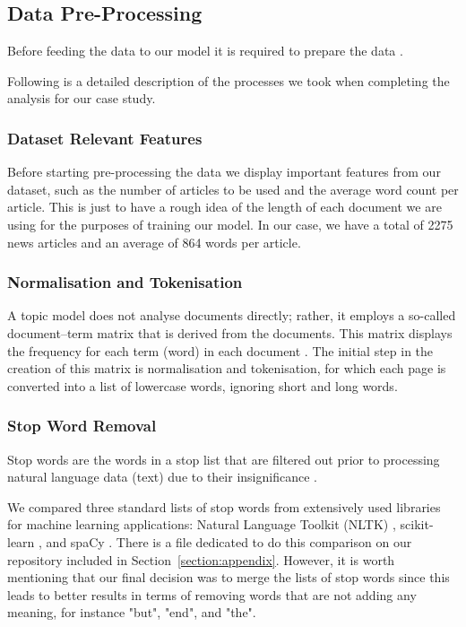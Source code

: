 \documentclass[twoside,12pt,a4paper]{article}
\begin{document}
\subsection{Data Pre-Processing}
Before feeding the data to our model it is required to prepare the data \citep{jacobi_quantitative_2016}.

Following is a detailed description of the processes we took when completing the analysis for our case study. 

\subsubsection{Dataset Relevant Features}
Before starting pre-processing the data we display important features from our dataset, such as the number of articles to be used and the average word count per article. This is just to have a rough idea of the length of each document we are using for the purposes of training our model. In our case, we have a total of 2275 news articles and an average of 864 words per article.

\subsubsection{Normalisation and Tokenisation}
A topic model does not analyse documents directly; rather, it employs a so-called document–term matrix that is derived from the documents. This matrix displays the frequency for each term (word) in each document \citep{jacobi_quantitative_2016}. The initial step in the creation of this matrix is normalisation and tokenisation, for which each page is converted into a list of lowercase words, ignoring short and long words.

\subsubsection{Stop Word Removal}
Stop words are the words in a stop list that are filtered out prior to processing natural language data (text) due to their insignificance \citep{rajaraman_mining_2011}.

We compared three standard lists of stop words from extensively used libraries for machine learning applications: Natural Language Toolkit (NLTK) \citep{bird_natural_nodate}, scikit-learn \citep{pedregosa_scikit-learn_nodate}, and spaCy \citep{spacy2}. There is a file dedicated to do this comparison on our repository included in Section~\ref{section:appendix}. However, it is worth mentioning that our final decision was to merge the lists of stop words since this leads to better results in terms of removing words that are not adding any meaning, for instance "but", "end", and "the".
\end{document}
